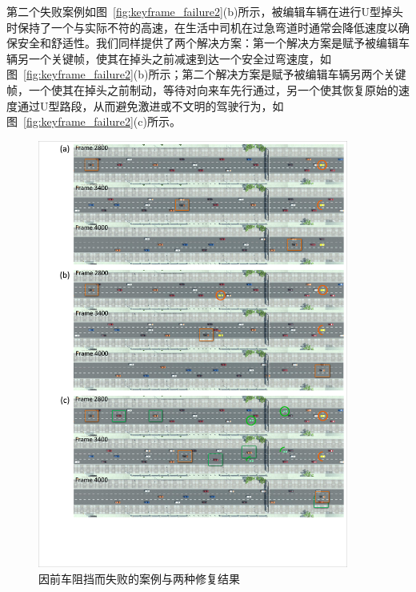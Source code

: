 第二个失败案例如图~\ref{fig:keyframe_failure2}(b)所示，被编辑车辆在进行U型掉头时保持了一个与实际不符的高速，在生活中司机在过急弯道时通常会降低速度以确保安全和舒适性。我们同样提供了两个解决方案：第一个解决方案是赋予被编辑车辆另一个关键帧，使其在掉头之前减速到达一个安全过弯速度，如图~\ref{fig:keyframe_failure2}(b)所示；第二个解决方案是赋予被编辑车辆另两个关键帧，一个使其在掉头之前制动，等待对向来车先行通过，另一个使其恢复原始的速度通过U型路段，从而避免激进或不文明的驾驶行为，如图~\ref{fig:keyframe_failure2}(c)所示。


\begin{figure}[!tbh]
\centering
\includegraphics[width=0.91\textwidth]{figure/keyframe/failure_cases1_v3.pdf}
\caption[因前车阻挡而失败的案例与两种修复结果]{
因前车阻挡而失败的案例与两种修复结果
}
\label{fig:keyframe_failure1}
\end{figure}


